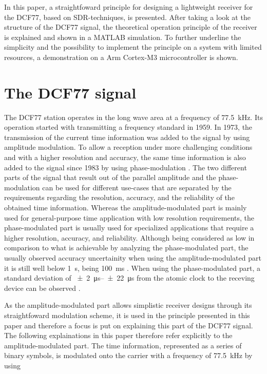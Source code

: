 \documentclass[conference]{IEEEtran}
\begin{document}
In this paper, a straightfoward principle for designing a lightweight receiver for the DCF77, based on SDR-techniques, is presented.
After taking a look at the structure of the DCF77 signal, the theoretical operation principle of the receiver is explained and shown in a MATLAB simulation.
To further underline the simplicity and the possibility to implement the principle on a system with limited resources, a demonstration on a Arm Cortex-M3 microcontroller
is shown.

\section{The DCF77 signal}
The DCF77 station operates in the long wave area at a frequency of \SI{77.5}{\kilo\hertz}.
Its operation started with transmitting a frequency standard in 1959.
In 1973, the transmission of the current time information was added to the signal by using amplitude modulation.
To allow a reception under more challenging conditions and with a higher resolution and accuracy, the same time information is also added to the signal since 1983 by using
phase-modulation \cite{b3}.
The two different parts of the signal that result out of the parallel amplitude and the phase-modulation can be used for different use-cases that are separated by the
requirements regarding the resolution, accuracy, and the reliability of the obtained time information. 
Whereas the amplitude-modulated part is mainly used for general-purpose time application with low resolution requirements, the phase-modulated part is usually used
for specialized applications that require a higher resolution, accuracy, and reliability.
Although being considered as low in comparison to what is achievable by analyzing the phase-modulated part, the usually observed accuracy uncertainity when using the
amplitude-modulated part it is still well below \SI{1}{\second}, being \SI{100}{\milli\second} \cite{b2}.
When using the phase-modulated part, a standard deviation of \SIrange{\pm 2}{\pm 22}{\micro\second} from the atomic clock to the receving device can be observed \cite{b4}.
\par
As the amplitude-modulated part allows simplistic receiver designs through its straightfoward modulation scheme, it is used in the principle presented in this paper
and therefore a focus is put on explaining this part of the DCF77 signal. The following explainations in this paper therefore refer explicitly to the amplitude-modulated part.
The time information, represented as a series of binary symbols, is modulated onto the carrier with a frequency of \SI{77.5}{\kilo\hertz} by using
\end{document}
